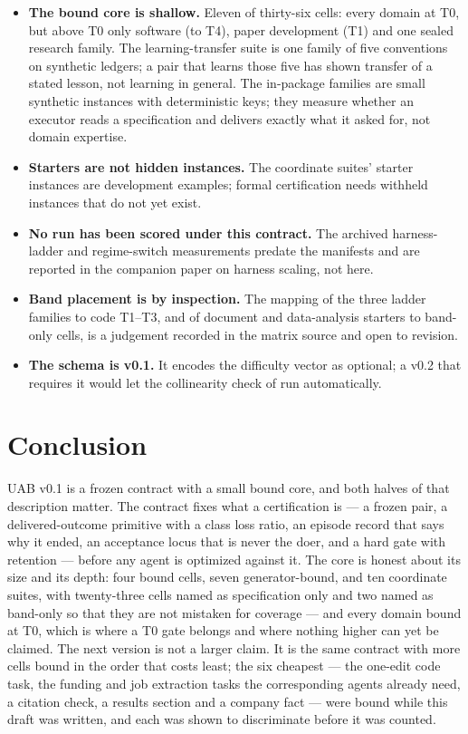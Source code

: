\documentclass[11pt]{article}
\theoremstyle{definition}
\begin{document}
\begin{itemize}[leftmargin=*]
\item \textbf{The bound core is shallow.} Eleven of thirty-six cells: every domain at T0, but above T0 only software (to T4), paper development (T1) and one sealed research family. The learning-transfer suite is one family of five conventions on synthetic ledgers; a pair that learns those five has shown transfer of a stated lesson, not learning in general. The in-package families are small synthetic instances with deterministic keys; they measure whether an executor reads a specification and delivers exactly what it asked for, not domain expertise.
\item \textbf{Starters are not hidden instances.} The coordinate suites' starter instances are development examples; formal certification needs withheld instances that do not yet exist.
\item \textbf{No run has been scored under this contract.} The archived harness-ladder and regime-switch measurements predate the manifests and are reported in the companion paper on harness scaling, not here.
\item \textbf{Band placement is by inspection.} The mapping of the three ladder families to code T1--T3, and of document and data-analysis starters to band-only cells, is a judgement recorded in the matrix source and open to revision.
\item \textbf{The schema is v0.1.} It encodes the difficulty vector as optional; a v0.2 that requires it would let the collinearity check of \citet{yang2026dlibench} run automatically.
\end{itemize}

\section{Conclusion}

UAB v0.1 is a frozen contract with a small bound core, and both halves of that description matter. The contract fixes what a certification is --- a frozen pair, a delivered-outcome primitive with a class loss ratio, an episode record that says why it ended, an acceptance locus that is never the doer, and a hard gate with retention --- before any agent is optimized against it. The core is honest about its size and its depth: four bound cells, seven generator-bound, and ten coordinate suites, with twenty-three cells named as specification only and two named as band-only so that they are not mistaken for coverage --- and every domain bound at T0, which is where a T0 gate belongs and where nothing higher can yet be claimed. The next version is not a larger claim. It is the same contract with more cells bound in the order that costs least; the six cheapest --- the one-edit code task, the funding and job extraction tasks the corresponding agents already need, a citation check, a results section and a company fact --- were bound while this draft was written, and each was shown to discriminate before it was counted.
\end{document}
